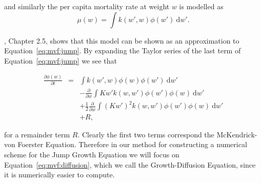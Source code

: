 \documentclass[../main.tex]{subfiles}
\begin{document}
  and similarly the per capita mortality rate at weight $w$ is modelled as
  \begin{equation}
    \mu(w) = \int k(w', w) \phi(w') \: \mathrm{d}w'.
  \end{equation}

  \cite{datta2010}, Chapter 2.5, shows that this model can be shown as an approximation to Equation~\ref{eq:mvf:jump}. By expanding the Taylor series of the last term of Equation~\ref{eq:mvf:jump} we see that

  \begin{eqnarray}\label{eq:mvf:diffusion}
    \frac{\partial \phi(w)}{\partial t}
    &=& \int k(w', w) \phi(w)\phi(w') \: \mathrm{d}w' \nonumber \\
    && - \frac{\partial}{\partial w} \int K w' k(w, w')\phi(w')\phi(w) \: \mathrm{d}w' \nonumber \\
    && + \frac{1}{2} \frac{\partial}{\partial w} \int (K w')^2 k(w, w')\phi(w')\phi(w)  \: \mathrm{d}w' \nonumber \\
    && + R,
  \end{eqnarray}

  for a remainder term $R$. Clearly the first two terms correspond the McKendrick-von Foerster Equation. Therefore in our method for constructing a numerical scheme for the Jump Growth Equation we will focus on Equation~\ref{eq:mvf:diffusion}, which we call the Growth-Diffusion Equation, since it is numerically easier to compute.
\end{document}
